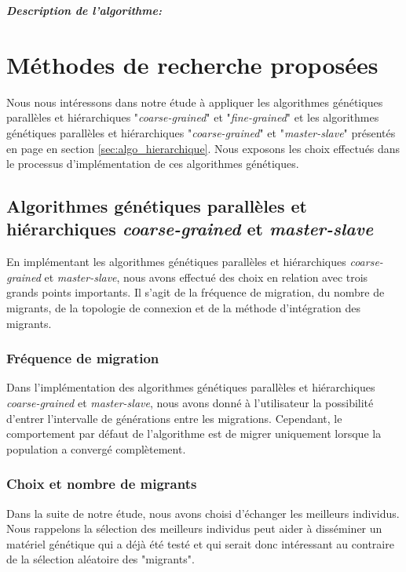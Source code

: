 	\vspace*{.3cm}
	\hspace*{.5cm} \textbf{\textsl{Description de l'algorithme:}}\\	
	
	\section{Méthodes de recherche proposées}	
	
	Nous nous intéressons dans notre étude à appliquer les algorithmes génétiques parallèles et hiérarchiques "\emph{coarse-grained}" et "\emph{fine-grained}" et les algorithmes génétiques parallèles et hiérarchiques "\emph{coarse-grained}" et "\emph{master-slave}" présentés en page en section \ref{sec:algo_hierarchique}. Nous exposons les choix effectués dans le processus d'implémentation de ces algorithmes génétiques.
	
	\subsection{Algorithmes génétiques parallèles et hiérarchiques \emph{coarse-grained} et \emph{master-slave}}
		
	En implémentant les algorithmes génétiques parallèles et hiérarchiques \emph{coarse-grained} et \emph{master-slave}, nous avons effectué des choix en relation avec trois grands points importants. Il s'agit de la fréquence de migration, du nombre de migrants, de la topologie de connexion et de la méthode d'intégration des migrants.
	 
	\subsubsection{Fréquence de migration}
	
	\hspace*{.5cm} Dans l'implémentation des algorithmes génétiques parallèles et hiérarchiques \emph{coarse-grained} et \emph{master-slave}, nous avons donné à l'utilisateur la possibilité d'entrer l'intervalle de générations entre les migrations. Cependant, le comportement par défaut de l'algorithme est de migrer uniquement lorsque la population a convergé complètement.  
	
	\subsubsection{Choix et nombre de migrants}
	 Dans la suite de notre étude, nous avons choisi d'échanger les meilleurs individus. Nous rappelons la sélection des meilleurs individus peut aider à disséminer un matériel génétique qui a déjà été testé et qui serait donc intéressant au contraire de la sélection aléatoire des "migrants".
	 
